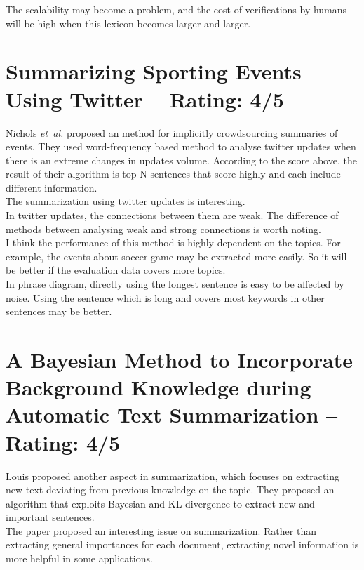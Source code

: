 \documentclass[a4paper]{article}
\begin{document}
The scalability may become a problem, and the cost of verifications by humans will be high when this lexicon becomes larger and larger.


\section{Summarizing Sporting Events Using Twitter -- Rating: 4/5}
Nichols \emph{et~al.} \cite{Nichols:IUI12} proposed an method for implicitly crowdsourcing summaries of events. They used word-frequency based method to analyse twitter updates when there is an extreme changes in updates volume. According to the score above, the result of their algorithm is top N sentences that score highly and each include different information.\\

The summarization using twitter updates is interesting.\\

In twitter updates, the connections between them are weak. The difference of methods between analysing weak and strong connections is worth noting.\\ 

I think the performance of this method is highly dependent on the topics. For example, the events about soccer game may be extracted more easily. So it will be better if the evaluation data covers more topics.\\

In phrase diagram, directly using the longest sentence is easy to be affected by noise. Using the sentence which is long and covers most keywords in other sentences may be better.


\section{A Bayesian Method to Incorporate Background Knowledge during Automatic Text Summarization -- Rating: 4/5}
Louis \cite{Louis:ACL14} proposed another aspect in summarization, which focuses on extracting new text deviating from previous knowledge on the topic. They proposed an algorithm that exploits Bayesian and KL-divergence to extract new and important sentences.\\

The paper proposed an interesting issue on summarization. Rather than extracting general importances for each document, extracting novel information is more helpful in some applications.\\
\end{document}
